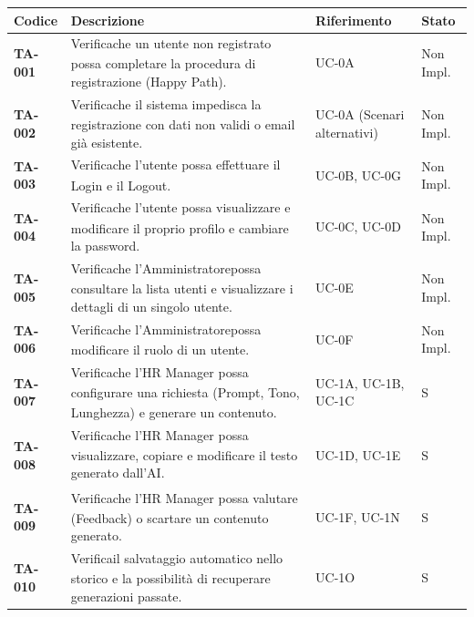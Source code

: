 \documentclass[a4paper,11pt]{article}
\renewcommand{\G}{\texorpdfstring{\textsubscript{\scalebox{0.6}{\textbf{G}}}\xspace}{ G}}
\begin{document}
\begin{longtable}{|p{2.0cm}|p{8.5cm}|p{2.5cm}|p{2.5cm}|}
  \hline
  \rowcolor{primaryblue!30} 
  \textbf{Codice} & \textbf{Descrizione} & \textbf{Riferimento} & \textbf{Stato} \\
  \hline
  \endhead
  
  \textbf{TA-001} & Verifica\G che un utente non registrato possa completare la procedura di registrazione (Happy Path). & UC-0A & Non Impl. \\
  \hline
  \textbf{TA-002} & Verifica\G che il sistema impedisca la registrazione con dati non validi o email già esistente. & UC-0A (Scenari alternativi) & Non Impl. \\
  \hline
  \textbf{TA-003} & Verifica\G che l'utente possa effettuare il Login e il Logout. & UC-0B, UC-0G & Non Impl. \\
  \hline
  \textbf{TA-004} & Verifica\G che l'utente possa visualizzare e modificare il proprio profilo e cambiare la password. & UC-0C, UC-0D & Non Impl. \\
  \hline
  
  \textbf{TA-005} & Verifica\G che l'Amministratore\G possa consultare la lista utenti e visualizzare i dettagli di un singolo utente. & UC-0E & Non Impl. \\
  \hline
  \textbf{TA-006} & Verifica\G che l'Amministratore\G possa modificare il ruolo di un utente. & UC-0F & Non Impl. \\
  \hline
  
  \textbf{TA-007} & Verifica\G che l'HR Manager possa configurare una richiesta (Prompt\G, Tono, Lunghezza) e generare un contenuto. & UC-1A, UC-1B, UC-1C & S \\
  \hline
  \textbf{TA-008} & Verifica\G che l'HR Manager possa visualizzare, copiare e modificare il testo generato dall'AI\G. & UC-1D, UC-1E & S \\
  \hline
  \textbf{TA-009} & Verifica\G che l'HR Manager possa valutare (Feedback) o scartare un contenuto generato. & UC-1F, UC-1N & S \\
  \hline
  \textbf{TA-010} & Verifica\G il salvataggio automatico nello storico e la possibilità di recuperare generazioni passate. & UC-1O & S \\
  \hline
  

\end{longtable}
\end{document}
